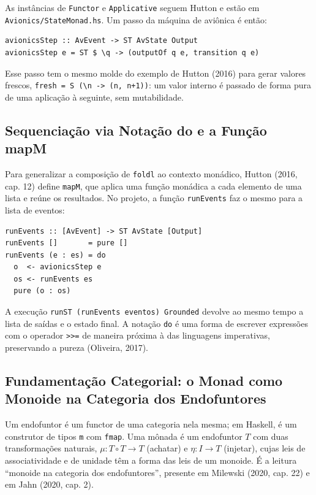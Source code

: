 \documentclass[12pt,a4paper]{article}
\begin{document}
As instâncias de \texttt{Functor} e \texttt{Applicative} seguem Hutton e estão em \texttt{Avionics/StateMonad.hs}. Um passo da máquina de aviônica é então:

\begin{verbatim}
avionicsStep :: AvEvent -> ST AvState Output
avionicsStep e = ST $ \q -> (outputOf q e, transition q e)
\end{verbatim}

Esse passo tem o mesmo molde do exemplo de Hutton (2016) para gerar valores frescos, \texttt{fresh = S (\textbackslash n -> (n, n+1))}: um valor interno é passado de forma pura de uma aplicação à seguinte, sem mutabilidade.

\subsection{Sequenciação via Notação do e a Função mapM}

Para generalizar a composição de \texttt{foldl} ao contexto monádico, Hutton (2016, cap. 12) define \texttt{mapM}, que aplica uma função monádica a cada elemento de uma lista e reúne os resultados. No projeto, a função \texttt{runEvents} faz o mesmo para a lista de eventos:

\begin{verbatim}
runEvents :: [AvEvent] -> ST AvState [Output]
runEvents []       = pure []
runEvents (e : es) = do
  o  <- avionicsStep e
  os <- runEvents es
  pure (o : os)
\end{verbatim}

A execução \texttt{runST (runEvents eventos) Grounded} devolve ao mesmo tempo a lista de saídas e o estado final. A notação \texttt{do} é uma forma de escrever expressões com o operador \texttt{>>=} de maneira próxima à das linguagens imperativas, preservando a pureza (Oliveira, 2017).

\subsection{Fundamentação Categorial: o Monad como Monoide na Categoria dos Endofuntores}

Um endofuntor é um functor de uma categoria nela mesma; em Haskell, é um construtor de tipos \texttt{m} com \texttt{fmap}. Uma mônada é um endofuntor $T$ com duas transformações naturais, $\mu : T \circ T \to T$ (achatar) e $\eta : I \to T$ (injetar), cujas leis de associatividade e de unidade têm a forma das leis de um monoide. É a leitura ``monoide na categoria dos endofuntores'', presente em Milewski (2020, cap. 22) e em Jahn (2020, cap. 2).
\end{document}
